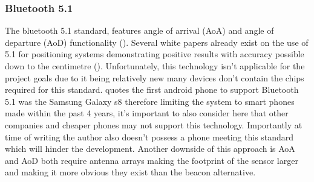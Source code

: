 \subsubsection{Bluetooth 5.1}
The bluetooth 5.1 standard, features angle of arrival (AoA) and angle of departure (AoD) functionality (\cite{lehtimki_bluetooth}). Several white papers already exist on the use of 5.1 for positioning systems demonstrating positive results with accuracy possible down to the centimetre (\cite{lehtimki_bluetooth}). Unfortunately, this technology isn't applicable for the project goals due to it being relatively new many devices don't contain the chips required for this standard. \cite{svetlik_2018_bluetooth} quotes the first android phone to support Bluetooth 5.1 was the Samsung Galaxy s8 therefore limiting the system to smart phones made within the past 4 years, it's important to also consider here that other companies and cheaper phones may not support this technology. Importantly at time of writing the author also doesn't possess a phone meeting this standard which will hinder the development. Another downside of this approach is AoA and AoD both require antenna arrays making the footprint of the sensor larger and making it more obvious they exist than the beacon alternative.
